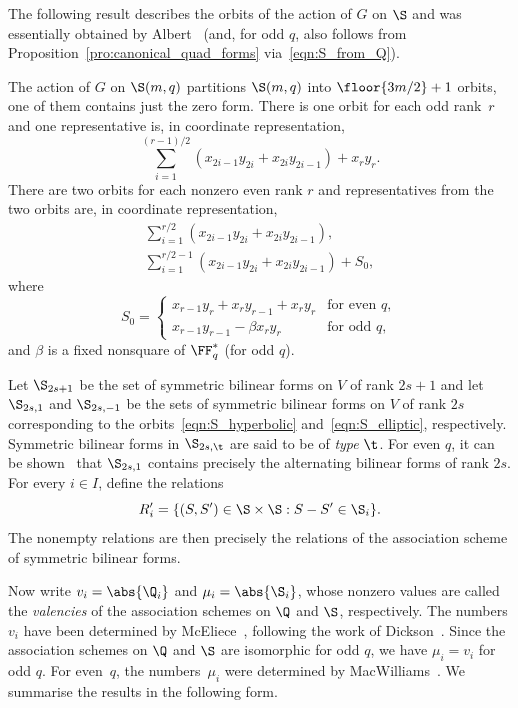 \par
The following result describes the orbits of the action of $G$ on $\S$ and was essentially obtained by Albert~\cite{Alb1938} (and, for odd $q$, also follows from Proposition~\ref{pro:canonical_quad_forms} via~\eqref{eqn:S_from_Q}).
\begin{prop}
\label{pro:canonical_sym_bil_forms}
The action of $G$ on $\S(m,q)$ partitions $\S(m,q)$ into $\floor{3m/2}+1$ orbits, one of them contains just the zero form. There is one orbit for each odd rank~$r$ and one representative is, in coordinate representation, 
\[
\sum_{i=1}^{(r-1)/2}(x_{2i-1}y_{2i}+x_{2i}y_{2i-1})+x_ry_r.
\]
There are two orbits for each nonzero even rank $r$ and representatives from the two orbits are, in coordinate representation,
\begin{gather}
\sum_{i=1}^{r/2}(x_{2i-1}y_{2i}+x_{2i}y_{2i-1}),   \label{eqn:S_hyperbolic}\\
\sum_{i=1}^{r/2-1}(x_{2i-1}y_{2i}+x_{2i}y_{2i-1})+S_0,   \label{eqn:S_elliptic}
\end{gather}
where 
\[
S_0=\begin{cases}
x_{r-1}y_r+x_ry_{r-1}+x_ry_r & \text{for even $q$},\\
x_{r-1}y_{r-1}-\beta x_ry_r       & \text{for odd $q$},
\end{cases}
\]
and $\beta$ is a fixed nonsquare of $\FF_q^*$ (for odd $q$).
\end{prop}
\par
Let $\S_{2s+1}$ be the set of symmetric bilinear forms on $V$ of rank $2s+1$ and let $\S_{2s,1}$ and $\S_{2s,-1}$ be the sets of symmetric bilinear forms on $V$ of rank $2s$ corresponding to the orbits~\eqref{eqn:S_hyperbolic} and~\eqref{eqn:S_elliptic}, respectively. Symmetric bilinear forms in $\S_{2s,\t}$ are said to be of \emph{type} $\t$. For even $q$, it can be shown~\cite{Alb1938} that $\S_{2s,1}$ contains precisely the alternating bilinear forms of rank $2s$. For every $i\in I$, define the relations 
\begin{equation}
R'_i=\{(S,S')\in\S\times \S:S-S'\in \S_i\}.   \label{eqn:relations_S}
\end{equation}
The nonempty relations are then precisely the relations of the association scheme of symmetric bilinear forms. 
\par
Now write $v_i=\abs{\Q_i}$ and $\mu_i=\abs{\S_i}$, whose nonzero values are called the \emph{valencies} of the association schemes on $\Q$ and $\S$, respectively. The numbers $v_i$ have been determined by McEliece~\cite{McE1969}, following the work of Dickson~\cite{Dic1958}. Since the association schemes on $\Q$ and $\S$ are isomorphic for odd $q$, we have $\mu_i=v_i$ for odd $q$. For even~$q$, the numbers~$\mu_i$ were determined by MacWilliams~\cite{Mac1969}. We summarise the results in the following form.
